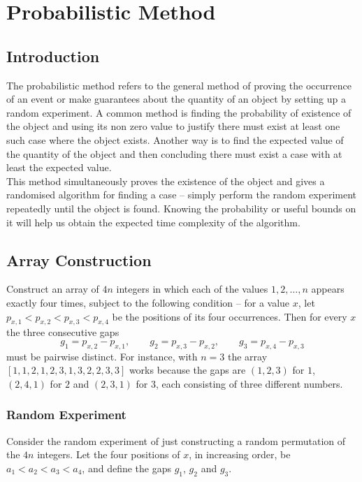 \chapter{Probabilistic Method}
\section{Introduction}
The probabilistic method refers to the general method of proving the occurrence of an event or make 
guarantees about the quantity of an object by setting up a random experiment. A common method is 
finding the probability of existence of the object and using its non zero value to justify there 
must exist at least one such case where the object exists. Another way is to find the expected value of 
the quantity of the object and then concluding there must exist a case with at least the expected value.\\

\noindent This method simultaneously proves the existence of the object and gives a randomised algorithm for 
finding a case -- simply perform the random experiment repeatedly until the object is found. Knowing 
the probability or useful bounds on it will help us obtain the expected time complexity of the algorithm.


\section{Array Construction}

Construct an array of $4n$ integers in which each of the values
$1,2,\dots,n$ appears exactly four times, subject to the following condition --
for a value $x$, let $p_{x,1}<p_{x,2}<p_{x,3}<p_{x,4}$ be the positions of its
four occurrences. Then for every $x$ the three consecutive gaps
\[
  g_1 = p_{x,2}-p_{x,1},\qquad
  g_2 = p_{x,3}-p_{x,2},\qquad
  g_3 = p_{x,4}-p_{x,3}
\]
must be pairwise distinct. For instance, with $n=3$ the array
$[1,1,2,1,2,3,1,3,2,2,3,3]$ works because the gaps are $(1,2,3)$ for $1$, $(2,4,1)$ for $2$
and $(2,3,1)$ for $3$, each consisting of three different numbers.\\

\subsection{Random Experiment}
Consider the random experiment of just constructing a random permutation of the $4n$ integers. 
Let the four positions of $x$, in increasing order, be
$a_1<a_2<a_3<a_4$, and define the gaps $g_1$, $g_2$ and $g_3$.

